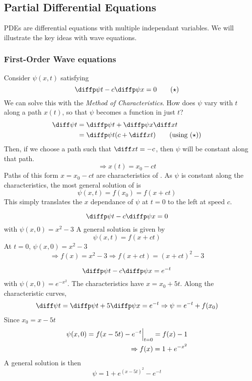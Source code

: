 \documentclass{article}
\begin{document}
\begin{eg}
    \begin{tikzpicture}

    \end{tikzpicture}
\end{eg}

\subsection{Partial Differential Equations}
PDEs are differential equations with multiple independant variables.
We will illustrate the key ideas with wave equations.

\subsubsection{First-Order Wave equations}
Consider $\psi(x, t)$ satisfying
\[
    \diffp \psi t - c \diffp \psi x = 0 \tagstar
\]
We can solve this with the \emph{Method of Characteristics}.
How does $\psi$ vary with $t$ along a path $x(t)$, so that $\psi$ becomes a function in just $t$?
\begin{align*}
    \diff \psi t &= \diffp \psi t + \diffp \psi x \diff xt \\
    &= \diffp \psi t (c + \diff xt) \tag{using \refstar}
\end{align*}
Then, if we choose a path such that $\diff xt = -c$, then $\psi$ will be constant along that path.
\[
    \Rightarrow x(t) = x_0 - ct
\]
Paths of this form $x = x_0 - ct$ are characteristics of .
As $\psi$ is constant along the characteristics, the most general solution of  is
\[
    \psi(x, t) = f(x_0) = f(x + ct)
\]
This simply translates the $x$ dependance of $\psi$ at $t = 0$ to the left at speed $c$.

\begin{eg}
    \[
        \diffp \psi t - c \diffp \psi x = 0 
    \]
    with $\psi(x, 0) = x^2 - 3$
    A general solution is given by
    \[
        \psi(x, t) = f(x + ct)  
    \]
    At $t = 0$, $\psi(x, 0) = x^2 - 3$
    \[
        \Rightarrow f(x) = x^2 - 3 \Rightarrow f(x + ct) = (x + ct)^2 - 3  
    \]
\end{eg}

\begin{eg}
    \[
        \diffp \psi t - c \diffp \psi x = e^{-t}
    \]
    with $\psi(x, 0) = e^{-x^2}$.
    The characteristics have $x = x_0 + 5t$.
    Along the characteristic curves,
    \begin{align*}
        \diff \psi t = \diffp \psi t + 5 \diffp \psi x = e^{-t}  
        \Rightarrow \psi = e^{-t} + f(x_0)
    \end{align*}
    Since $x_0 = x - 5t$
    \begin{align*}
        \psi (x, 0) = f(x - 5t) - e^{-t} \eval_{t=0}{} = f(x) - 1 \\
        \Rightarrow f(x) = 1 + e^{-x^2}
    \end{align*}
    A general solution is then
    \[
        \psi = 1 + e^{(x - 5t)^2} - e^{-t}  
    \]
\end{eg}
\end{document}

